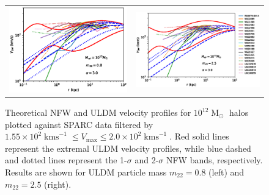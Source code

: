 \documentclass[a4paper,11pt]{article}
\begin{document}
\begin{figure}
\begin{tabular}{cc}
{\includegraphics[scale = 0.65, trim={2.5cm 2.5cm 2.1cm 0.1cm}]{pics/v_12_8_3.eps}} &
{\includegraphics[scale = 0.65, trim={2.1cm 2.5cm 0cm 0.1cm}]{pics/v_12_25_3.eps}}
\end{tabular}
\caption{Theoretical NFW and ULDM velocity profiles for $10^{12}\operatorname{M}_{\odot}$ halos plotted against SPARC data filtered by $1.55\times 10^2 \operatorname{kms}^{-1}\leq V_{\mathrm{max}}\leq 2.0\times 10^2 \operatorname{kms}^{-1}$. Red solid lines represent the extremal ULDM velocity profiles, while  blue dashed and dotted lines represent the 1-$\sigma$ and 2-$\sigma$ NFW bands, respectively. Results are shown for ULDM particle mass $m_{22} = 0.8$ (left) and $m_{22} = 2.5 $ (right). }\label{fig:velocity_12}
\end{figure}
\end{document}

